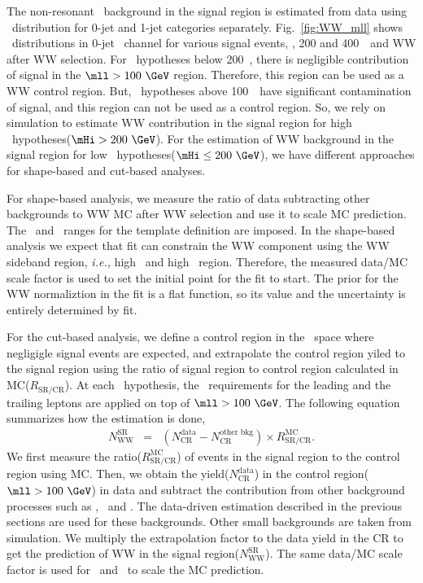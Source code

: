 The non-resonant \WW\ background in the signal region is estimated from data using \mll\ distribution
for 0-jet and 1-jet categories separately. 
Fig.~\ref{fig:WW_mll} shows \mll\ distributions in 0-jet \DF\ channel for various signal events,
, 200 and 400~\GeV\ and WW after WW selection. For \mHi\ hypotheses below 200~\GeV, 
there is negligible contribution of signal in the $\mll>100~\GeV$ region. 
Therefore, this region can be used as a WW control region.  
But, \mHi\ hypotheses above 100~\GeV\ have significant contamination of signal, 
and this region can not be used as a control region. So, we rely on simulation
to estimate WW contribution in the signal region for high \mHi\ hypotheses($\mHi>200~\GeV$). 
For the estimation of WW background in the signal region for low \mHi\ hypotheses($\mHi\le200~\GeV$), 
we have different approaches for shape-based and cut-based analyses. 

For shape-based analysis, we measure the ratio of data subtracting other backgrounds to WW MC  
after WW selection and use it to scale MC prediction. 
The \mll\ and \mT\ ranges for the template definition are imposed.  
In the shape-based analysis we expect that fit can constrain the WW component using 
the WW sideband region, \textit{i.e.,} high \mT\ and high \mll\ region. Therefore,   
the measured data/MC scale factor is used to set the initial point for the fit to start. 
The prior for the WW normaliztion in the fit is a flat function, 
so its value and the uncertainty is entirely determined by fit. 

For the cut-based analysis, we define a control region in the \mll\ space where 
negligigle signal events are expected, and extrapolate the control region yiled 
to the signal region using the ratio of signal region to control region calculated 
in MC($R_{\textrm{SR/CR}}$). 
At each \mHi\ hypothesis, the \pt\ requirements for the leading and the trailing leptons 
are applied on top of $\mll>100~\GeV$. The following equation summarizes 
how the estimation is done, 
\begin{eqnarray} 
N_{\textrm{WW}}^{\textrm{SR}} 
&=&  
\left( N_{\textrm{CR}}^{\textrm{data}}  
     - N_{\textrm{CR}}^{\textrm{other bkg}}\right) \times R_\textrm{SR/CR}^{\textrm{MC}}.  
\end{eqnarray} 
We first measure the ratio($R_\textrm{SR/CR}^{\textrm{MC}}$) of events in the signal region 
to the control region using MC.  
Then, we obtain the yield($N_{\textrm{CR}}^{\textrm{data}}$) in the 
control region($\mll>100~\GeV$) in data and subtract the contribution from other 
background processes such as \topbkg, \Wjets\ and \dyll.  
The data-driven estimation described in the previous sections are used for 
these backgrounds. Other small backgrounds are taken from simulation. 
We multiply the extrapolation factor to the data yield in the CR 
to get the prediction of WW in the signal region($N_{\textrm{WW}}^{\textrm{SR}}$).
The same data/MC scale factor is used for \qqww\ and \ggww\ to scale 
the MC prediction. 


